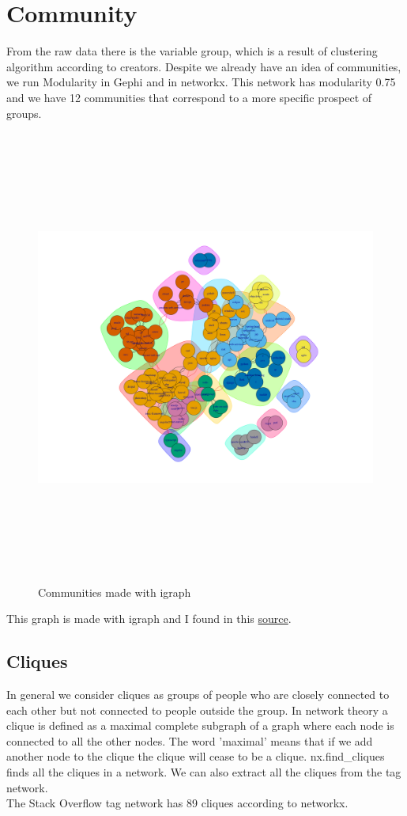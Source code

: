 \documentclass[12pt]{article}
\begin{document}
		\section{Community}
			From the raw data there is the variable group, which is a result of clustering algorithm according to creators. Despite we already have an idea of communities, we run Modularity in Gephi and in networkx. This network has modularity 0.75 and we have 12 communities that correspond to a more specific prospect of groups.  
			\begin{figure}[ht]
				\centering
				\includegraphics[width=16cm,height=15cm]{communities}
				\caption{Communities made with igraph}
			\end{figure}
			\FloatBarrier
			This graph is made with igraph and I found in this \href{https://www.kaggle.com/devisangeetha/network-visualizations-with-igraph}{source}.
			\subsection{Cliques}
				In general we consider cliques as groups of people who are closely connected to each other but not connected to people outside the group. In network theory a clique is defined as a maximal complete subgraph of a graph where each node is connected to all the other nodes. The word 'maximal' means that if we add another node to the clique the clique will cease to be a clique. nx.find\_cliques finds all the cliques in a network. We can also extract all the cliques from the tag network.\\
				The Stack Overflow tag network has 89 cliques according to networkx. 
\end{document}
